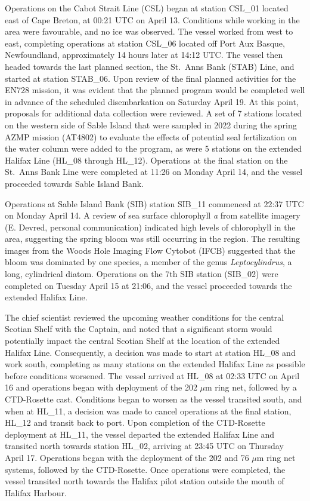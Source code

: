 \documentclass[12pt]{article}\usepackage[]{graphicx}\usepackage[]{color}
\begin{document}
Operations on the Cabot Strait Line (CSL) began at station CSL\_01 located east of Cape Breton, at 00:21 UTC on April 13. Conditions while working in the area were favourable, and no ice was observed. The vessel worked from west to east, completing operations at station CSL\_06 located off Port Aux Basque, Newfoundland, approximately 14 hours later at 14:12 UTC. The vessel then headed towards the last planned section, the St.~Anns Bank (STAB) Line, and started at station STAB\_06. Upon review of the final planned activities for the EN728 mission, it was evident that the planned program would be completed well in advance of the scheduled disembarkation on Saturday April 19. At this point, proposals for additional data collection were reviewed. A set of 7 stations located on the western side of Sable Island that were sampled in 2022 during the spring AZMP mission (AT4802) to evaluate the effects of potential seal fertilization on the water column were added to the program, as were 5 stations on the extended Halifax Line (HL\_08 through HL\_12). Operations at the final station on the St.~Anns Bank Line were completed at 11:26 on Monday April 14, and the vessel proceeded towards Sable Island Bank.

Operations at Sable Island Bank (SIB) station SIB\_11 commenced at 22:37 UTC on Monday April 14. A review of sea surface chlorophyll \emph{a} from satellite imagery (E. Devred, personal communication) indicated high levels of chlorophyll in the area, suggesting the spring bloom was still occurring in the region. The resulting images from the Woods Hole Imaging Flow Cytobot (IFCB) suggested that the bloom was dominated by one species, a member of the genus \emph{Leptocylindrus}, a long, cylindrical diatom. Operations on the 7th SIB station (SIB\_02) were completed on Tuesday April 15 at 21:06, and the vessel proceeded towards the extended Halifax Line.

The chief scientist reviewed the upcoming weather conditions for the central Scotian Shelf with the Captain, and noted that a significant storm would potentially impact the central Scotian Shelf at the location of the extended Halifax Line. Consequently, a decision was made to start at station HL\_08 and work south, completing as many stations on the extended Halifax Line as possible before conditions worsened. The vessel arrived at HL\_08 at 02:33 UTC on April 16 and operations began with deployment of the 202 \(\mu\)m ring net, followed by a CTD-Rosette cast. Conditions began to worsen as the vessel transited south, and when at HL\_11, a decision was made to cancel operations at the final station, HL\_12 and transit back to port. Upon completion of the CTD-Rosette deployment at HL\_11, the vessel departed the extended Halifax Line and transited north towards station HL\_02, arriving at 23:45 UTC on Thursday April 17. Operations began with the deployment of the 202 and 76 \(\mu\)m ring net systems, followed by the CTD-Rosette. Once operations were completed, the vessel transited north towards the Halifax pilot station outside the mouth of Halifax Harbour.
\end{document}
